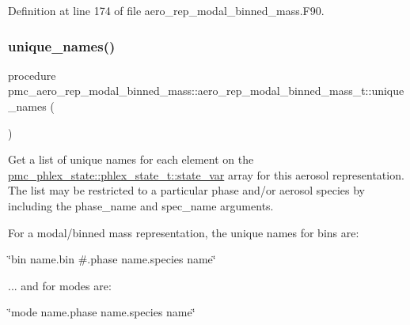 Definition at line 174 of file aero\+\_\+rep\+\_\+modal\+\_\+binned\+\_\+mass.\+F90.

\mbox{\label{structpmc__aero__rep__modal__binned__mass_1_1aero__rep__modal__binned__mass__t_ad92dc1ac6ed79708d3819a305dd25e5c}} 
\subsubsection{\texorpdfstring{unique\+\_\+names()}{unique\_names()}}
{\footnotesize\ttfamily procedure pmc\+\_\+aero\+\_\+rep\+\_\+modal\+\_\+binned\+\_\+mass\+::aero\+\_\+rep\+\_\+modal\+\_\+binned\+\_\+mass\+\_\+t\+::unique\+\_\+names (\begin{DoxyParamCaption}{ }\end{DoxyParamCaption})\hspace{0.3cm}{\ttfamily [private]}}



Get a list of unique names for each element on the {\ttfamily \mbox{\hyperlink{structpmc__phlex__state_1_1phlex__state__t_a78835cb552d483ebbfc7a6bc6f756918}{pmc\+\_\+phlex\+\_\+state\+::phlex\+\_\+state\+\_\+t\+::state\+\_\+var}}} array for this aerosol representation. The list may be restricted to a particular phase and/or aerosol species by including the phase\+\_\+name and spec\+\_\+name arguments. 

For a modal/binned mass representation, the unique names for bins are\+:
\begin{DoxyItemize}
\item \char`\"{}bin name.\+bin \#.\+phase name.\+species name\char`\"{}
\end{DoxyItemize}

... and for modes are\+:
\begin{DoxyItemize}
\item \char`\"{}mode name.\+phase name.\+species name\char`\"{} 
\end{DoxyItemize}

